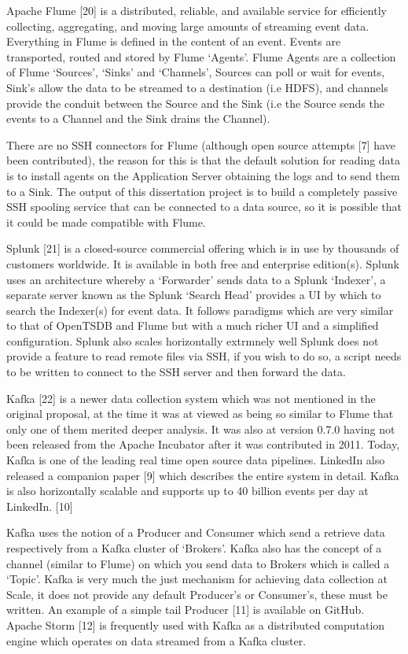 \documentclass{llncs}
\begin{document}
Apache Flume [20] is a distributed, reliable, and available service for efficiently collecting, aggregating, and moving large amounts of streaming event data. Everything in Flume is defined in the content of an event. Events are transported, routed and stored by Flume ‘Agents’. Flume Agents are a collection of Flume ‘Sources’, ‘Sinks’ and ‘Channels’, Sources can poll or wait for events, Sink’s allow the data to be streamed to a destination (i.e HDFS), and channels provide the conduit between the Source and the Sink (i.e the Source sends the events to a Channel and the Sink drains the Channel).

There are no SSH connectors for Flume (although open source attempts [7] have been contributed), the reason for this is that the default solution for reading data is to install agents on the Application Server obtaining the logs and to send them to a Sink. The output of this dissertation project is to build a completely passive SSH spooling service that can be connected to a data source, so it is possible that it could be made compatible with Flume.

Splunk [21] is a closed-source commercial offering which is in use by thousands of customers worldwide. It is available in both free and enterprise edition(s). Splunk uses an architecture whereby a ‘Forwarder’ sends data to a Splunk ‘Indexer’, a separate server known as the Splunk ‘Search Head’ provides a UI by which to search the Indexer(s) for event data. It follows paradigms which are very similar to that of OpenTSDB and Flume but with a much richer UI and a simplified configuration. Splunk also scales horizontally extrmnely well Splunk does not provide a feature to read remote files via SSH, if you wish to do so, a script needs to be written to connect to the SSH server and then forward the data.

Kafka [22] is a newer data collection system which was not mentioned in the original proposal, at the time it was at viewed as being so similar to Flume that only one of them merited deeper analysis. It was also at version 0.7.0 having not been released from the Apache Incubator after it was contributed in 2011. Today, Kafka is one of the leading real time open source data pipelines. LinkedIn also released a companion paper [9] which describes the entire system in detail. Kafka is also horizontally scalable and supports up to 40 billion events per day at LinkedIn. [10]

Kafka uses the notion of a Producer and Consumer which send a retrieve data respectively from a Kafka cluster of ‘Brokers’. Kafka also has the concept of a channel (similar to Flume) on which you send data to Brokers which is called a ‘Topic’. Kafka is very much the just mechanism for achieving data collection at Scale, it does not provide any default Producer’s or Consumer’s, these must be written. An example of a simple tail Producer [11] is available on GitHub. Apache Storm [12] is frequently used with Kafka as a distributed computation engine which operates on data streamed from a Kafka cluster.
\end{document}
